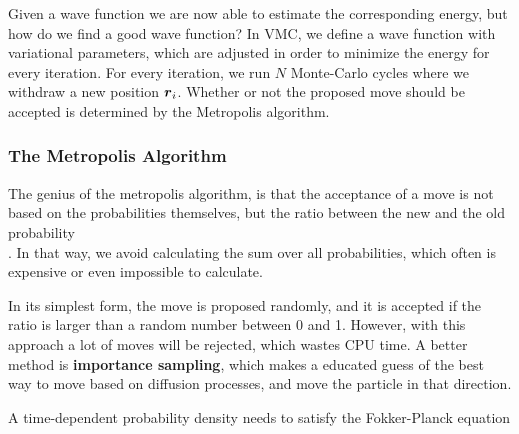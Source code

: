 Given a wave function we are now able to estimate the corresponding energy, but how do we find a good wave function? In VMC, we define a wave function with variational parameters, which are adjusted in order to minimize the energy for every iteration. For every iteration, we run $N$ Monte-Carlo cycles where we withdraw a new position $\boldsymbol{{r}}_i$. Whether or not the proposed move should be accepted is determined by the Metropolis algorithm.

\subsubsection{The Metropolis Algorithm}
The genius of the metropolis algorithm, is that the acceptance of a move is not based on the probabilities themselves, but the ratio between the new and the old probability\\
. In that way, we avoid calculating the sum over all probabilities, which often is expensive or even impossible to calculate. 

In its simplest form, the move is proposed randomly, and it is accepted if the ratio is larger than a random number between 0 and 1. However, with this approach a lot of moves will be rejected, which wastes CPU time. A better method is \textbf{importance sampling}, which makes a educated guess of the best way to move based on diffusion processes, and move the particle in that direction. 

A time-dependent probability density needs to satisfy the Fokker-Planck equation 